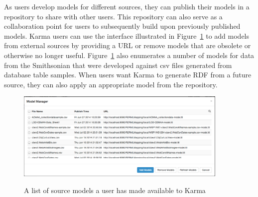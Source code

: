 As users develop models for different sources, they can publish their models in a repository to share with other users.  This repository can also serve as a collaboration point for users to subsequently build upon previously published models.  Karma users can use the interface illustrated in Figure~\ref{fig:model-manager-screenshot} to add models from external sources by providing a URL or remove models that are obsolete or otherwise no longer useful.  Figure~\ref{fig:model-manager-screenshot} also enumerates a number of models for data from the Smithsonian that were developed against csv files generated from database table samples.  When users want Karma to generate RDF from a future source, they can also apply an appropriate model from the repository.

\begin{figure}
\begin{center}
\includegraphics[width=4.0in]{3-model-manager.png}
\vspace{-3mm}
\caption{A list of source models a user has made available to Karma}
\vspace{-2mm}
\label{fig:model-manager-screenshot}
\end{center}
\vspace{-1.5em}
\end{figure}

